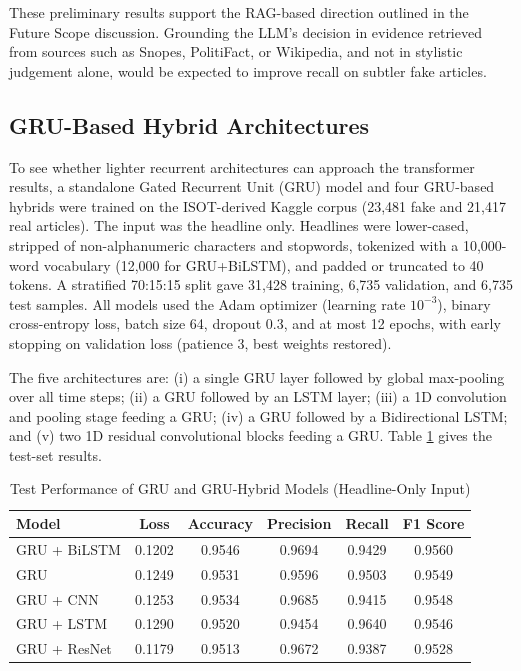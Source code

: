\documentclass[runningheads]{llncs}
\begin{document}
These preliminary results support the RAG-based direction outlined in the Future Scope discussion. Grounding the LLM's decision in evidence retrieved from sources such as Snopes, PolitiFact, or Wikipedia, and not in stylistic judgement alone, would be expected to improve recall on subtler fake articles.

\subsection{GRU-Based Hybrid Architectures}

To see whether lighter recurrent architectures can approach the transformer results, a standalone Gated Recurrent Unit (GRU) model and four GRU-based hybrids were trained on the ISOT-derived Kaggle corpus (23,481 fake and 21,417 real articles). The input was the headline only. Headlines were lower-cased, stripped of non-alphanumeric characters and stopwords, tokenized with a 10,000-word vocabulary (12,000 for GRU+BiLSTM), and padded or truncated to 40 tokens. A stratified 70:15:15 split gave 31,428 training, 6,735 validation, and 6,735 test samples. All models used the Adam optimizer (learning rate $10^{-3}$), binary cross-entropy loss, batch size 64, dropout 0.3, and at most 12 epochs, with early stopping on validation loss (patience 3, best weights restored).

The five architectures are: (i) a single GRU layer followed by global max-pooling over all time steps; (ii) a GRU followed by an LSTM layer; (iii) a 1D convolution and pooling stage feeding a GRU; (iv) a GRU followed by a Bidirectional LSTM; and (v) two 1D residual convolutional blocks feeding a GRU. Table \ref{tab:gru-comparison} gives the test-set results.

\begin{table}[H]
\centering
\caption{Test Performance of GRU and GRU-Hybrid Models (Headline-Only Input)}
\label{tab:gru-comparison}
\small
\begin{tabular}{|l|c|c|c|c|c|}
\hline
\textbf{Model} & \textbf{Loss} & \textbf{Accuracy} & \textbf{Precision} & \textbf{Recall} & \textbf{F1 Score} \\ \hline
GRU + BiLSTM & 0.1202 & 0.9546 & 0.9694 & 0.9429 & 0.9560 \\
GRU & 0.1249 & 0.9531 & 0.9596 & 0.9503 & 0.9549 \\
GRU + CNN & 0.1253 & 0.9534 & 0.9685 & 0.9415 & 0.9548 \\
GRU + LSTM & 0.1290 & 0.9520 & 0.9454 & 0.9640 & 0.9546 \\
GRU + ResNet & 0.1179 & 0.9513 & 0.9672 & 0.9387 & 0.9528 \\ \hline
\end{tabular}
\end{table}
\end{document}
